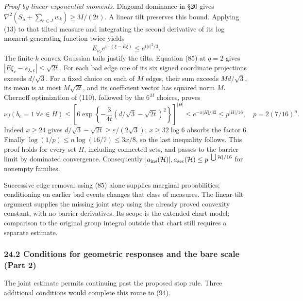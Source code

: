 \documentclass[11pt,a4paper]{article}
\begin{document}
\emph{Proof by linear exponential moments.} Diagonal dominance in §20
gives \(\nabla^2(S_\lambda+\sum_{e\in J}w_k)\ge3I/(2t)\). A linear tilt
preserves this bound. Applying (13) to that tilted measure and
integrating the second derivative of its log moment-generating function
twice yields \[E_{\nu_J}e^{v\cdot(\xi-E\xi)}\le e^{t|v|^2/3}.
\tag{110}\] The finite-\(k\) convex Gaussian tails justify the tilts.
Equation (85) at \(q=2\) gives \(|E\xi_e-s_{\lambda,e}|\le\sqrt{2t}\).
For each bad edge one of its six signed coordinate projections exceeds
\(d/\sqrt3\). For a fixed choice on each of \(M\) edges, their sum
exceeds \(Md/\sqrt3\), its mean is at most \(M\sqrt{2t}\), and its
coefficient vector has squared norm \(M\). Chernoff optimization of
(110), followed by the \(6^M\) choices, proves
\[\nu_J(b_e=1\ \forall e\in H)
\le\left[6\exp\left\{-\frac3{4t}
 (d/\sqrt3-\sqrt{2t})^2\right\}\right]^{|H|}
\le e^{-x|H|/32}\le p^{|H|/16},\quad p=2(7/16)^n.\tag{111}\] Indeed
\(x\ge24\) gives \(d/\sqrt3-\sqrt{2t}\ge\varepsilon/(2\sqrt3)\);
\(x\ge32\log6\) absorbs the factor 6. Finally
\(\log(1/p)\le n\log(16/7)\le3x/8\), so the last inequality follows.
This proof holds for every set \(H\), including connected sets, and
passes to the barrier limit by dominated convergence. Consequently
\(|a_{\rm ins}(\mathcal H)|,a_{\rm sec}(\mathcal H) \le p^{|\bigcup\mathcal H|/16}\)
for nonempty families.

Successive edge removal using (85) alone supplies marginal
probabilities; conditioning on earlier bad events changes that class of
measures. The linear-tilt argument supplies the missing joint step using
the already proved convexity constant, with no barrier derivatives. Its
scope is the extended chart model; comparison to the original group
integral outside that chart still requires a separate estimate.

\hypertarget{conditions-for-geometric-responses-and-the-bare-scale-part-2}{%
\subsubsection{24.2 Conditions for geometric responses and the bare
scale (Part
2)}\label{conditions-for-geometric-responses-and-the-bare-scale-part-2}}

The joint estimate permits continuing past the proposed stop rule. Three
additional conditions would complete this route to (94).
\end{document}
